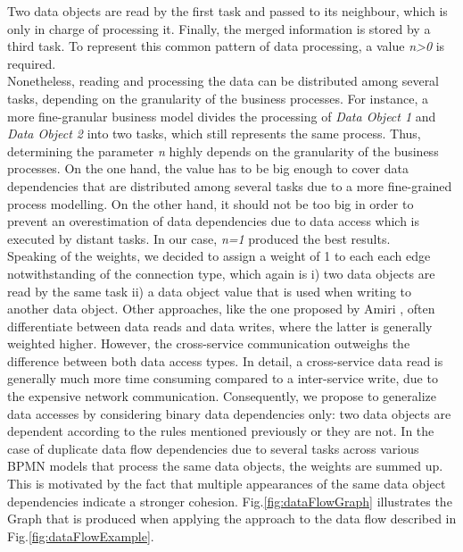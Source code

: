 \noindent
Two data objects are read by the first task and passed to its neighbour, which is only in charge of processing it. Finally, the merged information is stored by a third task. To represent this common pattern of data processing, a value \textit{n>0} is required. \\
Nonetheless, reading and processing the data can be distributed among several tasks, depending on the granularity of the business processes. For instance, a more fine-granular business model divides the processing of \textit{Data Object 1} and \textit{Data Object 2} into two tasks, which still represents the same process.
Thus, determining the parameter \textit{n} highly depends on the granularity of the business processes. On the one hand, the value has to be big enough to cover data dependencies that are distributed among several tasks due to a more fine-grained process modelling. On the other hand, it should not be too big in order to prevent an overestimation of data dependencies due to data access which is executed by distant tasks. In our case, \textit{n=1} produced the best results. \\
Speaking of the weights, we decided to assign a weight of 1 to each each edge notwithstanding of the connection type, which again is i) two data objects are read by the same task ii) a data object value that is used when writing to another data object. Other approaches, like the one proposed by Amiri \cite{ObjectAwareAmiri}, often differentiate between data reads and data writes, where the latter is generally weighted higher. However, the cross-service communication outweighs the difference between both data access types. In detail, a cross-service data read is generally much more time consuming compared to a inter-service write, due to the expensive network communication. Consequently, we propose to generalize data accesses by considering binary data dependencies only: two data objects are dependent according to the rules mentioned previously or they are not. 
In the case of duplicate data flow dependencies due to several tasks across various BPMN models that process the same data objects, the weights are summed up. This is motivated by the fact that multiple appearances of the same data object dependencies indicate a stronger cohesion.
Fig.\ref{fig:dataFlowGraph} illustrates the Graph that is produced when applying the approach to the data flow described in Fig.\ref{fig:dataFlowExample}.






